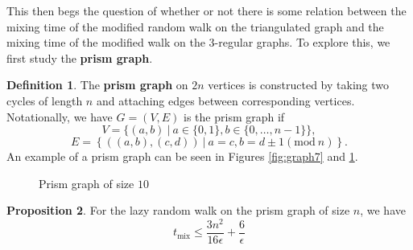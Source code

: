 \documentclass[10pt,a4paper]{amsart}
\theoremstyle{definition}
\newtheorem{definition}{Definition}
\numberwithin{definition}{section}
\newtheorem{proposition}[definition]{Proposition}
\newcommand{\Mod}[1]{(\mathrm{mod}\ #1)}
\begin{document}
This then begs the question of whether or not there is some relation between the mixing time of the modified random walk on the triangulated graph and the mixing time of the modified walk on the $3$-regular graphs. To explore this, we first study the \textbf{prism graph}. 

\begin{definition}
The \textbf{prism graph} on $2n$ vertices is constructed by taking two cycles of length $n$ and attaching edges between corresponding vertices. Notationally, we have $G = (V,E)$ is the prism graph if
\[ V = \{(a,b) \ | \ a \in \{0,1\}, b \in \{0, \ldots, n-1\} \}, \]
\[ E = \left\{\left((a,b), (c,d)\right) \ | \ a = c, b = d \pm 1 \Mod{n} \right\}.\]
An example of a prism graph can be seen in Figures \ref{fig:graph7} and \ref{fig:graph9}.  
\end{definition}

\begin{figure}
   
 \caption{Prism graph of size $10$}
    \label{fig:graph9}
\end{figure}

\begin{proposition}\label{prop:funsies}
For the lazy random walk on the prism graph of size $n$, we have 
\[t_{\text{mix}} \leq \frac{3 n^2}{16 \epsilon} + \frac{6}{\epsilon} \]
\end{proposition}
\end{document}
